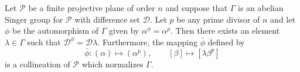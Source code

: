 Let $\mathcal{P}$ be a finite projective plane of order $n$ and suppose that $\Gamma$ is an abelian Singer group for $\mathcal{P}$ with difference set $\mathcal{D}$. Let $p$ be any prime divisor of $n$ and let $\phi$ be the automorphism of $\Gamma$ given by $\alpha^\phi = \alpha^p$. Then there exists an element $\lambda \in \Gamma$ such that $\mathcal{D}^\phi = \mathcal{D}\lambda$. Furthermore, the mapping $\bar{\phi}$ defined by
$$\bar{\phi} : (\alpha) \mapsto (\alpha^p), \qquad [\beta] \mapsto [\lambda \beta^p]$$
is a collineation of $\mathcal{P}$ which normalizes $\Gamma$.
